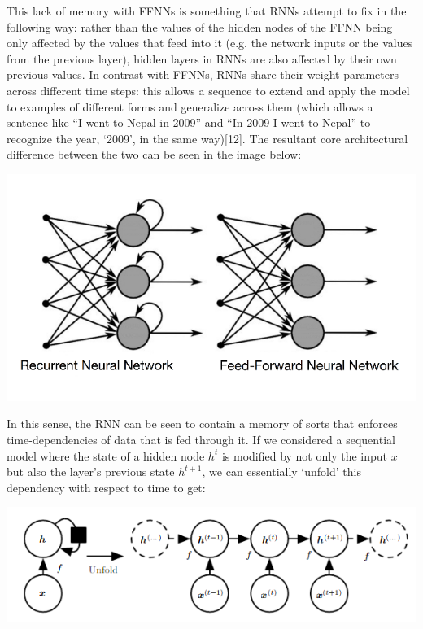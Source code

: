 \documentclass[12pt,twoside]{report}
\begin{document}
\quad This lack of memory with FFNNs is something that RNNs attempt to fix in the following way: rather than the values of the hidden nodes of the FFNN being only affected by the values that feed into it (e.g. the network inputs or the values from the previous layer), hidden layers in RNNs are also affected by their own previous values. In contrast with FFNNs, RNNs share their weight parameters across different time steps: this allows a sequence to extend and apply the model to examples of different forms and generalize across them (which allows a sentence like “I went to Nepal in 2009” and “In 2009 I went to Nepal” to recognize the year, ‘2009’, in the same way)[12]. The resultant core architectural difference between the two can be seen in the image below:\\

\begin{center}
\includegraphics[scale=1.4]{project_figures/fig3_1}
\end{center}

\quad In this sense, the RNN can be seen to contain a memory of sorts that enforces time-dependencies of data that is fed through it. If we considered a sequential model where the state of a hidden node $h^t$ is modified by not only the input $x$ but also the layer’s previous state $h^{t+1}$, we can essentially ‘unfold’ this dependency with respect to time to get:\\

\begin{center}
\includegraphics[scale=0.8]{project_figures/fig3_2}
\end{center}
\end{document}
